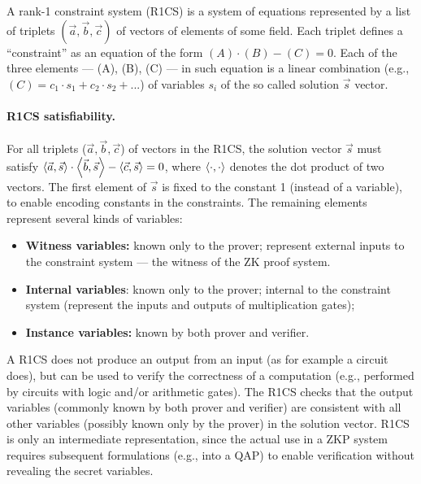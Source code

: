 
	A rank-1 constraint system (R1CS) is a system of equations represented by a 
list of triplets $(\vec{a}, \vec{b}, \vec{c})$ of vectors of elements of some field.
	Each triplet defines a ``constraint'' as an equation of the form $(A) \cdot (B) - (C) = 0$.
	Each of the three elements --- (A), (B), (C) --- in such equation is a linear combination 
(e.g., $(C) = c_1 \cdot s_1 + c_2 \cdot s_2 + ...$) of variables $s_i$ of the so called solution $\vec{s}$ vector.


\paragraph{R1CS satisfiability.}
	For all triplets ($\vec{a}, \vec{b}, \vec{c}$) of vectors in the R1CS, the solution vector $\vec{s}$ must satisfy 
$\left\langle \vec{a}, \vec{s}\right\rangle \cdot \left\langle \vec{b}, \vec{s}\right\rangle - \left\langle \vec{c}, \vec{s}\right\rangle = 0$, 
where $\left\langle \cdot, \cdot\right\rangle$ denotes the dot product of two vectors.
	The first element of $\vec{s}$ is fixed to the constant 1 (instead of a variable), to enable encoding constants in the constraints.
	The remaining elements represent several kinds of variables:
	\begin{itemize}
	\item \textbf{Witness variables:} 
	known only to the prover; represent external inputs to the constraint system --- the witness of the ZK proof system.
	\item \textbf{Internal variables}: 
	known only to the prover; internal to the constraint system (represent the inputs and outputs of multiplication gates);
	\item \textbf{Instance variables:} known by both prover and verifier.
	\end{itemize}

	A R1CS does not produce an output from an input (as for example a circuit does), but can be used to 
verify the correctness of a computation (e.g., performed by circuits with logic and/or arithmetic gates).
	The R1CS checks that the output variables (commonly known by both prover and verifier) are 
consistent with all other variables (possibly known only by the prover) in the solution vector.
	R1CS is only an intermediate representation, since the actual use in a ZKP system requires 
subsequent formulations (e.g., into a QAP) to enable verification without revealing the secret variables.


